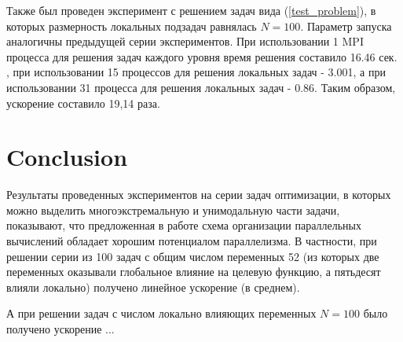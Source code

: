 \documentclass{svproc}
\begin{document}
Также был проведен эксперимент с решением задач вида (\ref{test_problem}), в которых размерность локальных подзадач равнялась $N=100$. Параметр запуска аналогичны предыдущей серии экспериментов.
При использовании 1 MPI процесса для решения задач каждого уровня время решения составило 16.46 сек. , при использовании 15 процессов для решения локальных задач - 3.001, а при использовании 31 процесса для решения локальных задач - 0.86. Таким образом, ускорение составило 19,14 раза.




\section{Conclusion} %

Результаты проведенных экспериментов на серии задач оптимизации, в которых можно выделить многоэкстремальную и унимодальную части задачи, показывают, что предложенная в работе схема организации параллельных вычислений обладает хорошим потенциалом параллелизма. 
В частности, при решении серии из 100 задач с общим числом переменных 52 (из которых две переменных оказывали глобальное влияние на целевую функцию, а пятьдесят влияли локально) получено линейное ускорение (в среднем). 

А при решении задач с числом локально влияющих переменных $N=100$ было получено ускорение ...




%
%

{}
\end{document}
